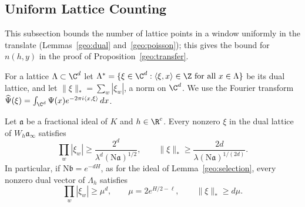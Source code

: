 \subsection{Uniform Lattice Counting}
This subsection bounds the number of lattice points in a window uniformly in
the translate (Lemmas~\ref{geo:dual} and~\ref{geo:poisson}); this gives the
bound for $n(h,y)$ in the proof of Proposition~\ref{geo:transfer}.

For a lattice $\Lambda\subset\C^d$ let
$\Lambda^*=\{\xi\in\C^d:\langle\xi,x\rangle\in\Z\text{ for all
}x\in\Lambda\}$ be its dual lattice, and let
$\|\xi\|_*=\sum_w|\xi_w|$, a norm on $\C^d$. We use the Fourier
transform $\widehat\Psi(\xi)=\int_{\C^d}\Psi(x)e^{-2\pi i\langle
x,\xi\rangle}\,dx$.

\begin{lemma}\label{geo:dual}
Let $\mathfrak a$ be a fractional ideal of $K$ and $h\in\R^c$. Every
nonzero $\xi$ in the dual lattice of $W_h\mathfrak a_\infty$ satisfies
\[
 \prod_w|\xi_w|\ge\frac{2^d}{\lambda^d(\mathrm N\mathfrak a)^{1/2}},
 \qquad
 \|\xi\|_*\ge\frac{2d}{\lambda(\mathrm N\mathfrak a)^{1/(2d)}}.
\]
In particular, if $\mathrm N\mathfrak b=e^{-dH}$, as for the ideal of
Lemma~\ref{geo:selection}, every nonzero dual vector of $\Lambda_h$
satisfies
\begin{equation}\label{geo:dual-product}
 \prod_w|\xi_w|\ge\mu^d,\qquad \mu=2e^{H/2-\ell},\qquad
 \|\xi\|_*\ge d\mu.
\end{equation}
\end{lemma}

